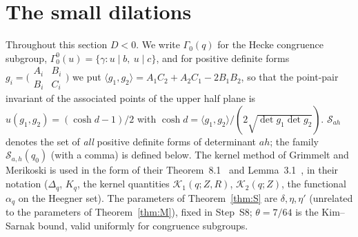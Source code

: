 \documentclass[11pt,a4paper]{article}
\begin{document}
\section{The small dilations}

Throughout this section $D<0$. We write $\Gamma_0(q)$ for the Hecke congruence subgroup, $\Gamma_0^0(u)=\{\gamma:u\mid b,\ u\mid c\}$, and for positive definite forms
$g_i=\bigl(\begin{smallmatrix}A_i&B_i\\B_i&C_i\end{smallmatrix}\bigr)$ we put $\langle g_1,g_2\rangle=A_1C_2+A_2C_1-2B_1B_2$, so that the point-pair invariant of the associated
points of the upper half plane is $u(g_1,g_2)=(\cosh d-1)/2$ with $\cosh d=\langle g_1,g_2\rangle/(2\sqrt{\det g_1\det g_2})$. $\mathcal S_{ah}$ denotes the set of \emph{all} positive
definite forms of determinant $ah$; the family $\mathcal S_{a,h}(q_0)$ (with a comma) is defined below. The kernel method of Grimmelt and Merikoski is used in the form of
their Theorem~8.1~\cite{GrimmeltMerikoski2025kernel} and Lemma~3.1~\cite{GrimmeltMerikoski2025quadratic}, in their notation ($\Delta_q$, $K_q$, the kernel quantities
$\mathcal K_1(q;Z,R)$, $\mathcal K_2(q;Z)$, the functional $\alpha_q$ on the Heegner set). The parameters of Theorem~\ref{thm:S} are $\delta,\eta,\eta'$ (unrelated to the parameters of
Theorem~\ref{thm:M}), fixed in Step~S8; $\theta=7/64$ is the Kim--Sarnak bound, valid uniformly for congruence subgroups.
\end{document}
